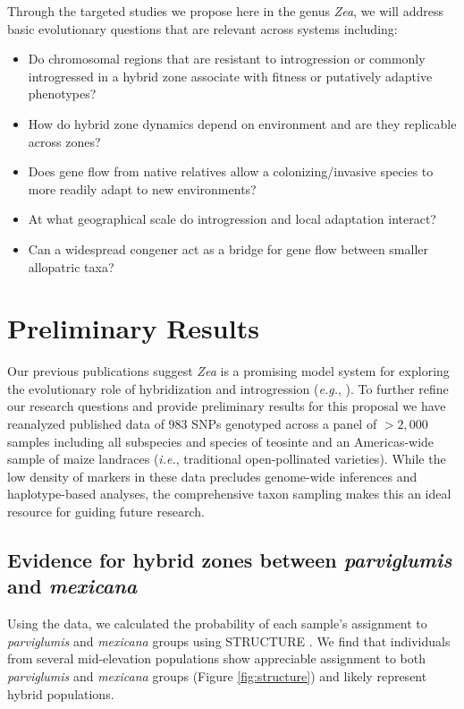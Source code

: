Through the targeted studies we propose here in the genus \emph{Zea}, we will address basic evolutionary questions that are relevant across systems including:
\begin{itemize}\itemsep0pt
\item Do chromosomal regions that are resistant to introgression or commonly introgressed in a hybrid zone associate with fitness or putatively adaptive phenotypes?
\item How do hybrid zone dynamics depend on environment and are they replicable across zones?
\item Does gene flow from native relatives allow a colonizing/invasive species to more readily adapt to new environments?
\item At what geographical scale do introgression and local adaptation interact?
\item Can a widespread congener act as a bridge for gene flow between smaller allopatric taxa?
\end{itemize}

\section*{Preliminary Results}

Our previous publications suggest \emph{Zea} is a promising model system for exploring the evolutionary role of hybridization and introgression (\emph{e.g.},  \citealt{Ross-Ibarra2009a, vanheerwaarden2011a, Hufford2013, Pyhajarvi2013}).  To further refine our research questions and provide preliminary results for this proposal we have reanalyzed published data  \citep{Fang2012} of 983 SNPs genotyped across a panel of $>2,000$ samples including all subspecies and species of teosinte and an Americas-wide sample of maize landraces (\emph{i.e.}, traditional open-pollinated varieties).  While the low density of markers in these data precludes genome-wide inferences and haplotype-based analyses, the comprehensive taxon sampling makes this an ideal resource for guiding future research.

\subsection*{Evidence for hybrid zones between \emph{parviglumis} and \emph{mexicana}}

Using the \citet{Fang2012} data, we calculated the probability of each sample's assignment to \emph{parviglumis} and \emph{mexicana} groups using STRUCTURE \citep{Pritchard2000}.  We find that individuals from several mid-elevation populations show appreciable assignment to both \emph{parviglumis} and \emph{mexicana} groups (Figure \ref{fig:structure}) and likely represent hybrid populations.  

